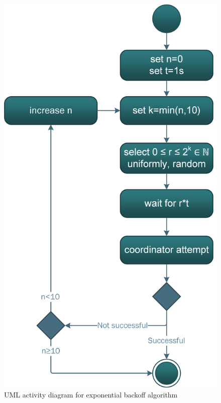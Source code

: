 \begin{figure}[htbp] %
	\caption{\gls{UML} activity diagram for exponential backoff algorithm} \label{figure:coordinator exponential backoff}
	\includegraphics[scale=0.8]{figures/exponential-backoff.png}
\end{figure}


